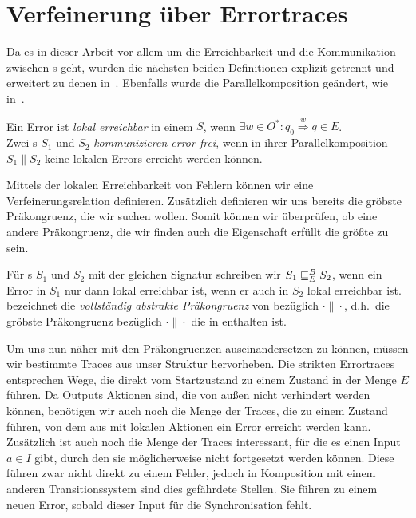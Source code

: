 \chapter{Verfeinerung über Errortraces}

Da es in dieser Arbeit vor allem um die Erreichbarkeit und die Kommunikation
zwischen \EIO{}s geht, wurden die nächsten beiden Definitionen explizit getrennt
und erweitert zu denen in~\cite{Vogler2014EIO}. Ebenfalls wurde die
Parallelkomposition geändert, wie in~\cite{Schlosser2012BA}.

\begin{Def}
  Ein Error ist \emph{lokal erreichbar} in einem \EIO{} $S$, wenn $\exists w\in O^*: q_0
  \overset{w}{\Rightarrow} q\in E$.\\
  Zwei \EIO{}s $S_1$ und $S_2$ \emph{kommunizieren error-frei}, wenn in ihrer
  Parallelkomposition $S_1\| S_2$ keine lokalen Errors erreicht werden können.
\end{Def}

Mittels der lokalen Erreichbarkeit von Fehlern können wir eine
Verfeinerungsrelation definieren. Zusätzlich definieren wir uns bereits die
gröbste Präkongruenz, die wir suchen wollen. Somit können wir überprüfen, ob
eine andere Präkongruenz, die wir finden auch die Eigenschaft erfüllt die
größte zu sein.

\begin{Def}
  Für \EIO{}s $S_1$ und $S_2$ mit der gleichen Signatur schreiben wir
  $S_1\sqsubseteq _E^B S_2$, wenn ein Error in $S_1$ nur dann lokal erreichbar ist, wenn er
  auch in $S_2$ lokal erreichbar ist.\\
  \ECRel{} bezeichnet die \emph{vollständig abstrakte Präkongruenz} von \EBRel{}
  bezüglich $\cdot\|\cdot$, d.h.\ die gröbste Präkongruenz bezüglich
  $\cdot\|\cdot$ die in \EBRel{} enthalten ist.
\end{Def}

Um uns nun näher mit den Präkongruenzen auseinandersetzen zu können, müssen wir bestimmte Traces
aus unser Struktur hervorheben. Die strikten Errortraces entsprechen Wege, die
direkt vom Startzustand zu einem Zustand in der Menge $E$ führen. Da Outputs Aktionen
sind, die von außen nicht verhindert werden können, benötigen wir auch noch die
Menge der Traces, die zu einem Zustand führen, von dem aus mit lokalen Aktionen
ein Error erreicht werden kann. Zusätzlich ist auch noch die Menge der Traces
interessant, für die es einen Input $a\in I$ gibt, durch den sie möglicherweise nicht
fortgesetzt werden können. Diese führen zwar nicht
direkt zu einem Fehler, jedoch in Komposition mit einem anderen
Transitionssystem sind
dies gefährdete Stellen. Sie führen zu einem neuen Error, sobald dieser Input
für die Synchronisation fehlt.

